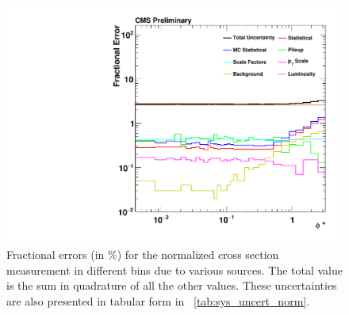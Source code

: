 \begin{figure}[!htbp]
    \centering
    \includegraphics[width=\textwidth]{figures/data_uncertainty_absolute.pdf}
    \caption[
        Fractional errors (in \%) for the normalized cross section measurement.
    ]{
        Fractional errors (in \%) for the normalized cross section measurement in
        different \phistar bins due to various sources. The total value is the
        sum in quadrature of all the other values. These uncertainties are also
        presented in tabular form in \TAB~\ref{tab:sys_uncert_norm}.
    }
    \label{fig:sys_uncert_norm}
\end{figure}
